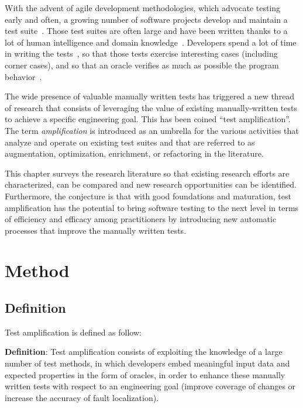With the advent of agile development methodologies, which advocate testing early and often, a growing number of software projects develop and maintain a test suite~\cite{Madeyski2010}. 
Those test suites are often large and have been written thanks to a lot of human intelligence and domain knowledge~\cite{azaidmanEMSE2011,DBLP:conf/icst/ZaidmanRDD08}. 
Developers spend a lot of time in writing the tests~\cite{BellerTSE,beller2015when,beller2015howmuch}, so that those tests exercise interesting cases (including corner cases), and so that an oracle verifies as much as possible the program behavior~\cite{hilton2018coverageevolution}.

The wide presence of valuable manually written tests has triggered a new thread of research that consists of leveraging the value of existing manually-written tests to achieve a specific engineering goal.
This has been coined ``test amplification''.
The term \emph{amplification} is introduced as an umbrella for the various activities that analyze and operate on existing test suites and that are referred to as augmentation, optimization, enrichment, or refactoring in the literature. 

This chapter surveys the research literature so that existing research efforts are characterized, can be compared and new research opportunities can be identified.
Furthermore, the conjecture is that with good foundations and maturation, test amplification has the potential to bring software testing to the next level in terms of efficiency and efficacy among practitioners by introducing new automatic processes that improve the manually written tests.

\section{Method}
\label{sec:sota:method}

\subsection{Definition}
\label{subsec:sota:method:definition}
Test amplification is defined as follow:

\begin{mdframed}
	\textbf{Definition}: Test amplification consists of exploiting the knowledge of a large number of test methods, in which developers embed meaningful input data and expected properties in the form of oracles, in order to enhance these manually written tests with respect to an engineering goal (\eg improve coverage of changes or increase the accuracy of fault localization).
\end{mdframed}


